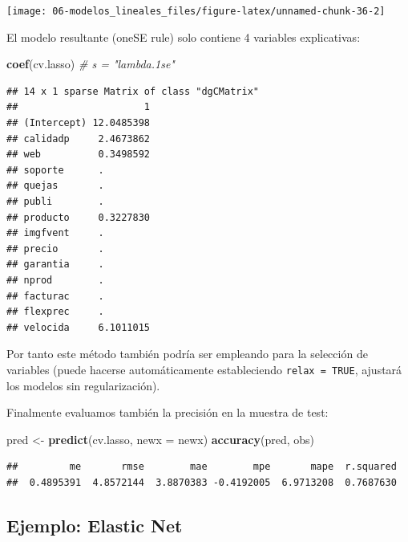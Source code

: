 \documentclass[
]{book}
\newenvironment{Shaded}{\begin{snugshade}}{\end{snugshade}}
\newcommand{\CommentTok}[1]{\textcolor[rgb]{0.56,0.35,0.01}{\textit{#1}}}
\newcommand{\DataTypeTok}[1]{\textcolor[rgb]{0.13,0.29,0.53}{#1}}
\newcommand{\KeywordTok}[1]{\textcolor[rgb]{0.13,0.29,0.53}{\textbf{#1}}}
\newcommand{\NormalTok}[1]{#1}
\newcommand{\StringTok}[1]{\textcolor[rgb]{0.31,0.60,0.02}{#1}}
\theoremstyle{break}
\theoremstyle{definition}
\theoremstyle{definition}
\theoremstyle{definition}
\theoremstyle{remark}
\begin{document}
\begin{center}\texttt{[image: 06-modelos\_lineales\_files/figure-latex/unnamed-chunk-36-2]} \end{center}

El modelo resultante (oneSE rule) solo contiene 4 variables explicativas:

\begin{Shaded}
\begin{Highlighting}[]
\KeywordTok{coef}\NormalTok{(cv.lasso) }\CommentTok{# s = "lambda.1se"}
\end{Highlighting}
\end{Shaded}

\begin{verbatim}
## 14 x 1 sparse Matrix of class "dgCMatrix"
##                      1
## (Intercept) 12.0485398
## calidadp     2.4673862
## web          0.3498592
## soporte      .        
## quejas       .        
## publi        .        
## producto     0.3227830
## imgfvent     .        
## precio       .        
## garantia     .        
## nprod        .        
## facturac     .        
## flexprec     .        
## velocida     6.1011015
\end{verbatim}

Por tanto este método también podría ser empleando para la selección de variables (puede hacerse automáticamente estableciendo \texttt{relax\ =\ TRUE}, ajustará los modelos sin regularización).

Finalmente evaluamos también la precisión en la muestra de test:

\begin{Shaded}
\begin{Highlighting}[]
\NormalTok{pred <-}\StringTok{ }\KeywordTok{predict}\NormalTok{(cv.lasso, }\DataTypeTok{newx =}\NormalTok{ newx)}
\KeywordTok{accuracy}\NormalTok{(pred, obs)}
\end{Highlighting}
\end{Shaded}

\begin{verbatim}
##         me       rmse        mae        mpe       mape  r.squared 
##  0.4895391  4.8572144  3.8870383 -0.4192005  6.9713208  0.7687630
\end{verbatim}

\hypertarget{ejemplo-elastic-net}{%
\subsection{Ejemplo: Elastic Net}\label{ejemplo-elastic-net}}
\end{document}
